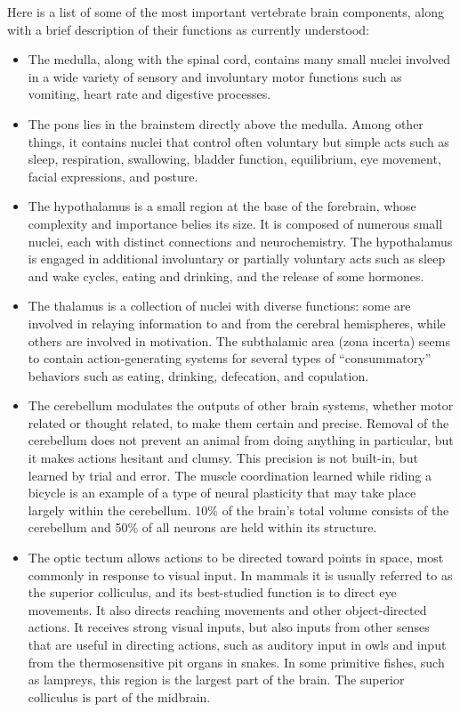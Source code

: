 Here is a list of some of the most important vertebrate brain components, along with a brief description of their functions as currently understood:

\begin{itemize}
\tightlist
\item
  The medulla, along with the spinal cord, contains many small nuclei involved in a wide variety of sensory and involuntary motor functions such as vomiting, heart rate and digestive processes.
\item
  The pons lies in the brainstem directly above the medulla. Among other things, it contains nuclei that control often voluntary but simple acts such as sleep, respiration, swallowing, bladder function, equilibrium, eye movement, facial expressions, and posture.
\item
  The hypothalamus is a small region at the base of the forebrain, whose complexity and importance belies its size. It is composed of numerous small nuclei, each with distinct connections and neurochemistry. The hypothalamus is engaged in additional involuntary or partially voluntary acts such as sleep and wake cycles, eating and drinking, and the release of some hormones.
\item
  The thalamus is a collection of nuclei with diverse functions: some are involved in relaying information to and from the cerebral hemispheres, while others are involved in motivation. The subthalamic area (zona incerta) seems to contain action-generating systems for several types of ``consummatory'' behaviors such as eating, drinking, defecation, and copulation.
\item
  The cerebellum modulates the outputs of other brain systems, whether motor related or thought related, to make them certain and precise. Removal of the cerebellum does not prevent an animal from doing anything in particular, but it makes actions hesitant and clumsy. This precision is not built-in, but learned by trial and error. The muscle coordination learned while riding a bicycle is an example of a type of neural plasticity that may take place largely within the cerebellum. 10\% of the brain's total volume consists of the cerebellum and 50\% of all neurons are held within its structure.
\item
  The optic tectum allows actions to be directed toward points in space, most commonly in response to visual input. In mammals it is usually referred to as the superior colliculus, and its best-studied function is to direct eye movements. It also directs reaching movements and other object-directed actions. It receives strong visual inputs, but also inputs from other senses that are useful in directing actions, such as auditory input in owls and input from the thermosensitive pit organs in snakes. In some primitive fishes, such as lampreys, this region is the largest part of the brain. The superior colliculus is part of the midbrain.

\end{itemize}
